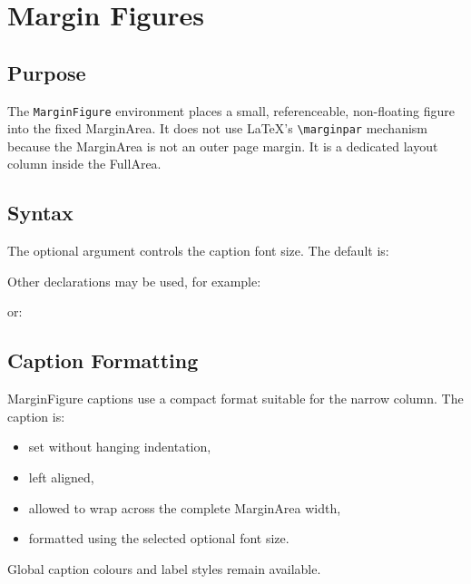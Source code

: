 \documentclass[
11pt,
a4paper,
oneside
]{scrbook}
\begin{document}





\chapter{Margin Figures}
\label{chap:margin-figures}

\section{Purpose}

The \texttt{MarginFigure} environment places a small, referenceable,
non-floating figure into the fixed MarginArea.
It does not use LaTeX's \verb|\marginpar| mechanism because the MarginArea is
not an outer page margin.
It is a dedicated layout column inside the FullArea.

\section{Syntax}





The optional argument controls the caption font size.
The default is:




Other declarations may be used, for example:




	or:




	
\section{Caption Formatting}
 
MarginFigure captions use a compact format suitable for the narrow column.
The caption is:
\begin{itemize}
	\item set without hanging indentation,
	\item left aligned,
	\item allowed to wrap across the complete MarginArea width,
	\item formatted using the selected optional font size.
\end{itemize}
Global caption colours and label styles remain available.
 
\end{document}
